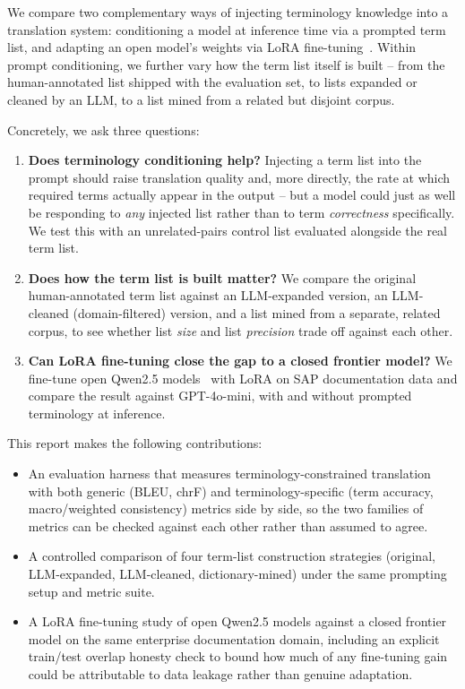 \documentclass[11pt]{article}
\begin{document}
We compare two complementary ways of injecting terminology knowledge into a translation system: conditioning a model at inference time via a prompted term list, and adapting an open model's weights via LoRA fine-tuning~\citep{hu2022lora}. Within prompt conditioning, we further vary how the term list itself is built -- from the human-annotated list shipped with the evaluation set, to lists expanded or cleaned by an LLM, to a list mined from a related but disjoint corpus.

Concretely, we ask three questions:

\begin{enumerate}
    \item \textbf{Does terminology conditioning help?} Injecting a term list into the prompt should raise translation quality and, more directly, the rate at which required terms actually appear in the output -- but a model could just as well be responding to \emph{any} injected list rather than to term \emph{correctness} specifically. We test this with an unrelated-pairs control list evaluated alongside the real term list.
    \item \textbf{Does how the term list is built matter?} We compare the original human-annotated term list against an LLM-expanded version, an LLM-cleaned (domain-filtered) version, and a list mined from a separate, related corpus, to see whether list \emph{size} and list \emph{precision} trade off against each other.
    \item \textbf{Can LoRA fine-tuning close the gap to a closed frontier model?} We fine-tune open Qwen2.5 models~\citep{qwenteam2024qwen25} with LoRA on SAP documentation data and compare the result against GPT-4o-mini, with and without prompted terminology at inference.
\end{enumerate}


This report makes the following contributions:
\begin{itemize}
    \item An evaluation harness that measures terminology-constrained translation with both generic (BLEU, chrF) and terminology-specific (term accuracy, macro/weighted consistency) metrics side by side, so the two families of metrics can be checked against each other rather than assumed to agree.
    \item A controlled comparison of four term-list construction strategies (original, LLM-expanded, LLM-cleaned, dictionary-mined) under the same prompting setup and metric suite.
    \item A LoRA fine-tuning study of open Qwen2.5 models against a closed frontier model on the same enterprise documentation domain, including an explicit train/test overlap honesty check to bound how much of any fine-tuning gain could be attributable to data leakage rather than genuine adaptation.
\end{itemize}
\end{document}
